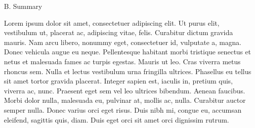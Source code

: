 \documentclass{proposal} %
\begin{document}
  \begin{center}\leavevmode
    \normalfont
    { B. Summary }%
  \end{center}%

%


\noindent%


Lorem ipsum dolor sit amet, consectetuer adipiscing elit. Ut purus elit, vestibulum ut, placerat ac, adipiscing vitae, felis. Curabitur dictum gravida mauris. Nam arcu libero, nonummy eget, consectetuer id, vulputate a, magna. Donec vehicula augue eu neque. Pellentesque habitant morbi tristique senectus et netus et malesuada fames ac turpis egestas. Mauris ut leo. Cras viverra metus rhoncus sem. Nulla et lectus vestibulum urna fringilla ultrices. Phasellus eu tellus sit amet tortor gravida placerat. Integer sapien est, iaculis in, pretium quis, viverra ac, nunc. Praesent eget sem vel leo ultrices bibendum. Aenean faucibus. Morbi dolor nulla, malesuada eu, pulvinar at, mollis ac, nulla. Curabitur auctor semper nulla. Donec varius orci eget risus. Duis nibh mi, congue eu, accumsan eleifend, sagittis quis, diam. Duis eget orci sit amet orci dignissim rutrum.



\vspace{3ex}
\vspace{1mm}

\noindent
\lipsum[2]


\vspace{3ex}
\vspace{1mm}

\noindent %
\lipsum[3]
\end{document}
